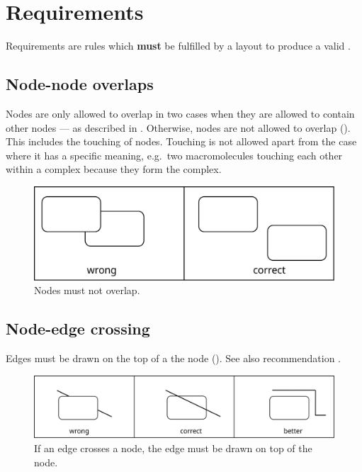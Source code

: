 \section{Requirements}

Requirements are rules which \textbf{must} be fulfilled by a layout to
produce a valid \PDm.

\subsection{Node-node overlaps}

Nodes are only allowed to overlap in two cases when they are allowed to contain other nodes --- as described in . Otherwise, nodes are not allowed to overlap (). This includes the
touching of nodes. Touching is not allowed apart from the case where
it has a specific meaning, e.g.\, two macromolecules touching each
other within a complex because they form the complex.

\begin{figure}[htb]
  \centering
  \includegraphics[scale=0.3]{images/layout-node-node}
  \caption{Nodes must not overlap.}\label{fig:layout1}
\end{figure}

\subsection{Node-edge crossing}\label{crosEdNoRe}

Edges must be drawn on the top of a the node (). See also recommendation .

\begin{figure}[htb]
  \centering
  \includegraphics[scale=0.3]{images/layout-node-edge}
  \caption{If an edge crosses a node, the edge must be drawn on top
  of the node.}\label{fig:layout2}
\end{figure}

